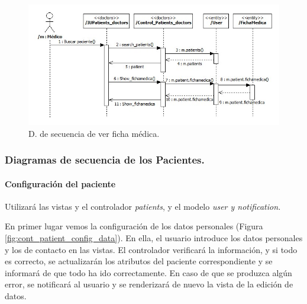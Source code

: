 						\begin{figure}[H]
						  \centering
						    \includegraphics[width=14cm]{img/jpg/secuencia/6_doc_ver_ficha.jpg}
						  \caption{D. de secuencia de ver ficha médica.}
						  \label{fig:cont_doc_ficha}
						\end{figure}
				

			
			\subsubsection{Diagramas de secuencia de los Pacientes.} %
			\label{par:diagramas_de_secuencia_de_los_pacientes_}
			
				\paragraph{Configuración del paciente} %
				\label{subp:cont_configuracion_paciente}
				
					Utilizará las vistas y el controlador \textit{patients}, y el modelo \textit{user y notification.}
					
					En primer lugar vemos la configuración de los datos personales (Figura \ref{fig:cont_patient_config_data}). En ella, el usuario introduce los datos personales y los de contacto en las vistas. El controlador verificará la información, y si todo es correcto, se actualizarán los atributos del paciente correspondiente y se informará de que todo ha ido correctamente. En caso de que se produzca algún error, se notificará al usuario y se renderizará de nuevo la vista de la edición de datos.
					
